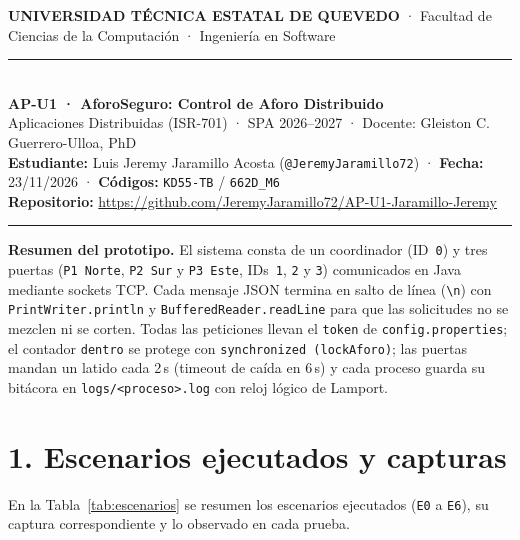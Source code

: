 \documentclass[10pt,a4paper]{article}
\begin{document}
\begin{center}
    {\large \textbf{UNIVERSIDAD TÉCNICA ESTATAL DE QUEVEDO}} · Facultad de Ciencias de la Computación · Ingeniería en Software\\[0.08cm]
    \rule{\linewidth}{0.45mm}\\[0.14cm]
    {\Large \textbf{AP-U1 · AforoSeguro: Control de Aforo Distribuido}}\\[0.08cm]
    {\small Aplicaciones Distribuidas (ISR-701) · SPA 2026--2027 · Docente: Gleiston C. Guerrero-Ulloa, PhD}\\[0.06cm]
    {\small \textbf{Estudiante:} Luis Jeremy Jaramillo Acosta (\texttt{@JeremyJaramillo72}) · \textbf{Fecha:} 23/11/2026 · \textbf{Códigos:} \texttt{KD55-TB} / \texttt{662D\_M6}}\\[0.05cm]
    {\footnotesize \textbf{Repositorio:} \url{https://github.com/JeremyJaramillo72/AP-U1-Jaramillo-Jeremy}}\\[0.08cm]
    \rule{\linewidth}{0.45mm}
\end{center}

\vspace{-0.12cm}
\noindent\textbf{Resumen del prototipo.} El sistema consta de un coordinador (ID~\texttt{0}) y tres puertas (\texttt{P1 Norte}, \texttt{P2 Sur} y \texttt{P3 Este}, IDs~\texttt{1}, \texttt{2} y \texttt{3}) comunicados en Java mediante sockets TCP. Cada mensaje JSON termina en salto de línea (\texttt{\textbackslash n}) con \texttt{PrintWriter.println} y \texttt{BufferedReader.readLine} para que las solicitudes no se mezclen ni se corten. Todas las peticiones llevan el \texttt{token} de \texttt{config.properties}; el contador \texttt{dentro} se protege con \texttt{synchronized (lockAforo)}; las puertas mandan un latido cada 2\,s (timeout de caída en 6\,s) y cada proceso guarda su bitácora en \texttt{logs/<proceso>.log} con reloj lógico de Lamport.

\section*{1. Escenarios ejecutados y capturas}
\vspace{-0.15cm}

En la Tabla~\ref{tab:escenarios} se resumen los escenarios ejecutados (\texttt{E0} a \texttt{E6}), su captura correspondiente y lo observado en cada prueba.
\end{document}
